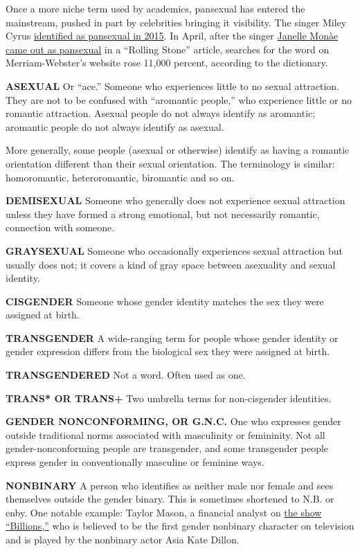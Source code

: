 Once a more niche term used by academics, pansexual has entered the
mainstream, pushed in part by celebrities bringing it visibility. The
singer Miley Cyrus
\href{https://www.elle.com/uk/life-and-culture/news/a27520/miley-cyrus-interview-october-2015/}{identified
as pansexual in 2015}. In April, after the singer
\href{https://www.rollingstone.com/music/features/cover-story-janelle-monae-prince-new-lp-her-sexuality-w519523}{Janelle
Monàe came out as pansexual} in a ``Rolling Stone'' article, searches
for the word on Merriam-Webster's website rose 11,000 percent, according
to the dictionary.

\textbf{ASEXUAL} Or ``ace.'' Someone who experiences little to no sexual
attraction. They are not to be confused with ``aromantic people,'' who
experience little or no romantic attraction. Asexual people do not
always identify as aromantic; aromantic people do not always identify as
asexual.

More generally, some people (asexual or otherwise) identify as having a
romantic orientation different than their sexual orientation. The
terminology is similar: homoromantic, heteroromantic, biromantic and so
on.

\textbf{DEMISEXUAL} Someone who generally does not experience sexual
attraction unless they have formed a strong emotional, but not
necessarily romantic, connection with someone.

\textbf{GRAYSEXUAL} Someone who occasionally experiences sexual
attraction but usually does not; it covers a kind of gray space between
asexuality and sexual identity.

\textbf{CISGENDER} Someone whose gender identity matches the sex they
were assigned at birth.

\textbf{TRANSGENDER} A wide-ranging term for people whose gender
identity or gender expression differs from the biological sex they were
assigned at birth.

\textbf{TRANSGENDERED} Not a word. Often used as one.

\textbf{TRANS* OR TRANS+} Two umbrella terms for non-cisgender
identities.

\textbf{GENDER NONCONFORMING, OR G.N.C.} One who expresses gender
outside traditional norms associated with masculinity or femininity. Not
all gender-nonconforming people are transgender, and some transgender
people express gender in conventionally masculine or feminine ways.

\textbf{NONBINARY} A person who identifies as neither male nor female
and sees themselves outside the gender binary. This is sometimes
shortened to N.B. or enby. One notable example: Taylor Mason, a
financial analyst on
\href{https://www.nytimes3xbfgragh.onion/column/billions-tv-recaps}{the
show ``Billions,''} who is believed to be the first gender nonbinary
character on television and is played by the nonbinary actor Asia Kate
Dillon.

